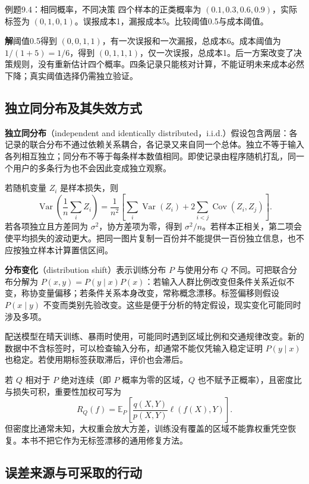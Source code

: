 \documentclass[UTF8,fontset=none,zihao=-4,a4paper]{ctexart}
\newcommand{\term}[1]{\textbf{#1}}
\newcommand{\sol}{\par\noindent\textbf{解}\quad}
\numberwithin{equation}{section}
\numberwithin{figure}{section}
\begin{document}
\begin{infobox}{例题9.4：相同概率，不同决策}
四个样本的正类概率为 $(0.1,0.3,0.6,0.9)$，实际标签为 $(0,1,0,1)$。误报成本1，漏报成本5。比较阈值0.5与成本阈值。
\end{infobox}
\sol 阈值0.5得到 $(0,0,1,1)$，有一次误报和一次漏报，总成本6。成本阈值为 $1/(1+5)=1/6$，得到 $(0,1,1,1)$，仅一次误报，总成本1。后一方案改变了决策规则，没有重新估计四个概率。四条记录只能核对计算，不能证明未来成本必然下降；真实阈值选择仍需独立验证。

\subsection{独立同分布及其失效方式}
\term{独立同分布}（independent and identically distributed，i.i.d.）假设包含两层：各记录的联合分布不通过依赖关系耦合，各记录又来自同一个总体。独立不等于输入各列相互独立；同分布不等于每条样本数值相同。即使记录由程序随机打乱，同一个用户的多条行为也不会因此变成独立观察。

若随机变量 $Z_i$ 是样本损失，则
\[
 \operatorname{Var}\!\left(\frac1n\sum_i Z_i\right)
 =\frac1{n^2}\left[\sum_i\operatorname{Var}(Z_i)+2\sum_{i<j}\operatorname{Cov}(Z_i,Z_j)\right].
\]
若各项独立且方差同为 $\sigma^2$，协方差项为零，得到 $\sigma^2/n$。若样本正相关，第二项会使平均损失的波动更大。把同一图片复制一百份并不能提供一百份独立信息，也不应按独立样本计算置信区间。

\term{分布变化}（distribution shift）表示训练分布 $P$ 与使用分布 $Q$ 不同。可把联合分布分解为 $P(x,y)=P(y\mid x)P(x)$：若输入人群比例改变但条件关系近似不变，称协变量偏移；若条件关系本身改变，常称概念漂移。标签偏移则假设 $P(x\mid y)$ 不变而类别先验改变。这些是便于分析的特定假设，现实变化可能同时涉及多项。

配送模型在晴天训练、暴雨时使用，可能同时遇到区域比例和交通规律改变。新的数据中不含标签时，可以检查输入分布，却通常不能仅凭输入稳定证明 $P(y\mid x)$ 也稳定。若使用期标签获取滞后，评价也会滞后。

若 $Q$ 相对于 $P$ 绝对连续（即 $P$ 概率为零的区域，$Q$ 也不赋予正概率），且密度比与损失可积，重要性加权可写为
\[
 R_Q(f)=\mathbb E_P\!\left[\frac{q(X,Y)}{p(X,Y)}\ell(f(X),Y)\right].
\]
但密度比通常未知，大权重会放大方差，训练没有覆盖的区域不能靠权重凭空恢复。本书不把它作为无标签漂移的通用修复方法。

\subsection{误差来源与可采取的行动}
\end{document}
